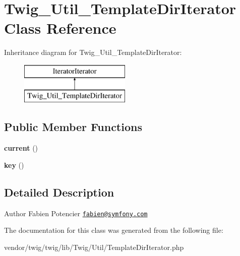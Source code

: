 \hypertarget{classTwig__Util__TemplateDirIterator}{}\section{Twig\+\_\+\+Util\+\_\+\+Template\+Dir\+Iterator Class Reference}
\label{classTwig__Util__TemplateDirIterator}
Inheritance diagram for Twig\+\_\+\+Util\+\_\+\+Template\+Dir\+Iterator\+:\begin{figure}[H]
\begin{center}
\leavevmode
\includegraphics[height=2.000000cm]{classTwig__Util__TemplateDirIterator}
\end{center}
\end{figure}
\subsection*{Public Member Functions}
\begin{DoxyCompactItemize}
\item 
{\bfseries current} ()\hypertarget{classTwig__Util__TemplateDirIterator_a8f256a2e1d65aaf38781db8397f224a2}{}\label{classTwig__Util__TemplateDirIterator_a8f256a2e1d65aaf38781db8397f224a2}

\item 
{\bfseries key} ()\hypertarget{classTwig__Util__TemplateDirIterator_a68b1d0a4ef639bcb16ba36ed4eee6803}{}\label{classTwig__Util__TemplateDirIterator_a68b1d0a4ef639bcb16ba36ed4eee6803}

\end{DoxyCompactItemize}


\subsection{Detailed Description}
\begin{DoxyAuthor}{Author}
Fabien Potencier \href{mailto:fabien@symfony.com}{\tt fabien@symfony.\+com} 
\end{DoxyAuthor}


The documentation for this class was generated from the following file\+:\begin{DoxyCompactItemize}
\item 
vendor/twig/twig/lib/\+Twig/\+Util/Template\+Dir\+Iterator.\+php\end{DoxyCompactItemize}
